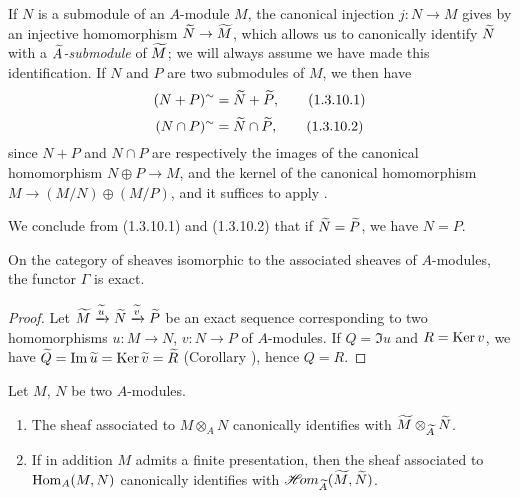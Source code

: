 \begin{env}[1.3.10]
\label{1.1.3.10}
If $N$ is a submodule of an $A$-module $M$, the canonical injection $j:N\to M$ gives by
 an injective homomorphism $\widetilde{N}\to\widetilde{M}$, which allows us
to canonically identify $\widetilde{N}$ with a \emph{$\widetilde{A}$-submodule} of
$\widetilde{M}$; we will always assume we have made this identification. If $N$ and $P$ are
two submodules of $M$, we then have
\[
  (N+P)^\sim=\widetilde{N}+\widetilde{P},
  \tag{1.3.10.1}
\]
\[
  (N\cap P)^\sim=\widetilde{N}\cap\widetilde{P},
  \tag{1.3.10.2}
\]
since $N+P$ and $N\cap P$ are respectively the images of the canonical homomorphism
$N\oplus P\to M$, and the kernel of the canonical homomorphism $M\to(M/N)\oplus(M/P)$, and
it suffices to apply .

We conclude from (1.3.10.1) and (1.3.10.2) that if $\widetilde{N}=\widetilde{P}$, we have
$N=P$.
\end{env}

\begin{cor}[1.3.11]
\label{1.1.3.11}
On the category of sheaves isomorphic to the associated sheaves of $A$-modules, the functor
$\Gamma$ is exact.
\end{cor}

\begin{proof}
\label{proof-1.1.3.11}
Let $\widetilde{M}\xrightarrow{\widetilde{u}}\widetilde{N}
\xrightarrow{\widetilde{v}}\widetilde{P}$ be an exact sequence corresponding to two
homomorphisms $u:M\to N$, $v:N\to P$ of $A$-modules. If $Q=\Im u$ and $R={\mathop{\mathrm{Ker}}\nolimits}\, v$, we have
$\widetilde{Q}={\mathop{\mathrm{Im}}\nolimits}\,\widetilde{u}={\mathop{\mathrm{Ker}}\nolimits}\,\widetilde{v}=\widetilde{R}$ (Corollary ),
hence $Q=R$.
\end{proof}

\begin{cor}[1.3.12]
\label{1.1.3.12}
Let $M$, $N$ be two $A$-modules.
\begin{enumerate}[label=\emph{(\roman*)}]
  \item The sheaf associated to $M\otimes_A N$ canonically identifies with $\widetilde{M}\otimes_{\widetilde{A}}\widetilde{N}$.
  \item If in addition $M$ admits a finite presentation, then the sheaf associated to ${\mathop{\mathrm{Hom}}\nolimits}_A(M,N)$ canonically identifies with $\mathscr{H}\!{om}_{\widetilde{A}}(\widetilde{M},\widetilde{N})$.
\end{enumerate}
\end{cor}

